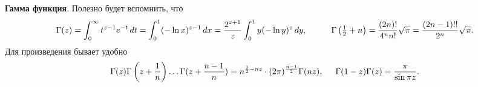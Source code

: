 \textbf{Гамма функция}. Полезно будет вспомнить, что
\begin{equation*}
	\Gamma(z) = \int_{0}^{\infty} t^{z-1} e^{-t} \d t = \int_{0}^{1} (-\ln x)^{z-1} \d x = \frac{2^{z+1}}{z} \int_{0}^{1} y (-\ln y)^{z} \d y,
	\hspace{10 mm} 
	\Gamma\left(\tfrac{1}{2} + n\right) = \frac{(2n)!}{4^n n!} \sqrt{\pi} = \frac{(2n-1)!!}{2^n} \sqrt{\pi}.
\end{equation*}
Для произведения бывает удобно
\begin{equation*}
	\Gamma(z) \Gamma\left(z + \frac{1}{n}\right) \ldots \Gamma(z + \frac{n-1}{n}) = n^{\frac{1}{2} - nz } \cdot (2 \pi)^{\frac{n-1}{2}} \Gamma(nz),
	\hspace{5 mm} 
	\Gamma(1-z) \Gamma(z) = \frac{\pi}{\sin \pi z}.
\end{equation*}

